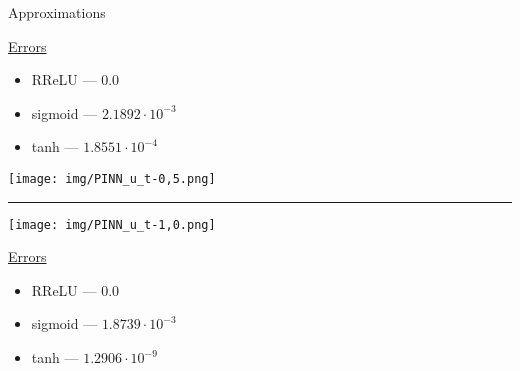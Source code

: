     \begin{frame}{Approximations}
        \hspace*{0.5cm}
        \vspace*{-0.5cm}
        \begin{minipage}{0.49\textwidth}
            \vspace*{-0.6cm}
            \scriptsize
            \underline{Errors}
            \begin{itemize}
                \item \alert{RReLU --- $0.0$}
                \item sigmoid --- $2.1892\cdot 10^{-3}$
                \item tanh --- $1.8551\cdot 10^{-4}$
            \end{itemize}
        \end{minipage}
        \begin{minipage}{0.39\textwidth}
            {\centering
                \texttt{[image: img/PINN\_u\_t-0,5.png]}
            }
        \end{minipage}
        
        {\color{lightgray}\hrule}
        
        \vspace*{0.05cm}
        \begin{minipage}{0.59\textwidth}
            {\centering
                \texttt{[image: img/PINN\_u\_t-1,0.png]}
            }
        \end{minipage}
        \begin{minipage}{0.39\textwidth}
            \scriptsize
            \underline{Errors}
            \begin{itemize}
                \item \alert{RReLU --- $0.0$}
                \item sigmoid --- $1.8739\cdot 10^{-3}$
                \item tanh --- $1.2906\cdot 10^{-9}$
            \end{itemize}
        \end{minipage}
    \end{frame}
    

